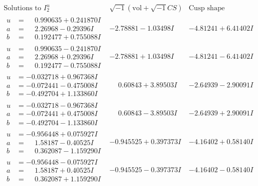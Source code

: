 \documentclass[1p]{elsarticle_modified}
\theoremstyle{definition}
\newcommand{\I}{\sqrt{-1}}
\begin{document}
$$\begin{array}{c|c|c}  
\text{Solutions to }I^u_{2}& \I (\text{vol} + \sqrt{-1}CS) & \text{Cusp shape}\\
 \hline 
\begin{aligned}
u &= \phantom{-}0.990635 + 0.241870 I \\
a &= \phantom{-}2.26968 - 0.29396 I \\
b &= \phantom{-}0.192477 + 0.755088 I\end{aligned}
 & -2.78881 - 1.03498 I & -4.81241 + 6.41402 I \\ \hline\begin{aligned}
u &= \phantom{-}0.990635 - 0.241870 I \\
a &= \phantom{-}2.26968 + 0.29396 I \\
b &= \phantom{-}0.192477 - 0.755088 I\end{aligned}
 & -2.78881 + 1.03498 I & -4.81241 - 6.41402 I \\ \hline\begin{aligned}
u &= -0.032718 + 0.967368 I \\
a &= -0.072441 - 0.475008 I \\
b &= -0.492704 + 1.133860 I\end{aligned}
 & \phantom{-}0.60843 + 3.89503 I & -2.64939 - 2.90091 I \\ \hline\begin{aligned}
u &= -0.032718 - 0.967368 I \\
a &= -0.072441 + 0.475008 I \\
b &= -0.492704 - 1.133860 I\end{aligned}
 & \phantom{-}0.60843 - 3.89503 I & -2.64939 + 2.90091 I \\ \hline\begin{aligned}
u &= -0.956448 + 0.075927 I \\
a &= \phantom{-}1.58187 - 0.40525 I \\
b &= \phantom{-}0.362087 - 1.159290 I\end{aligned}
 & -0.945525 + 0.397373 I & -4.16402 + 0.58140 I \\ \hline\begin{aligned}
u &= -0.956448 - 0.075927 I \\
a &= \phantom{-}1.58187 + 0.40525 I \\
b &= \phantom{-}0.362087 + 1.159290 I\end{aligned}
 & -0.945525 - 0.397373 I & -4.16402 - 0.58140 I \\ \hline\begin{aligned}

\end{aligned}
\end{array}$$
\end{document}
